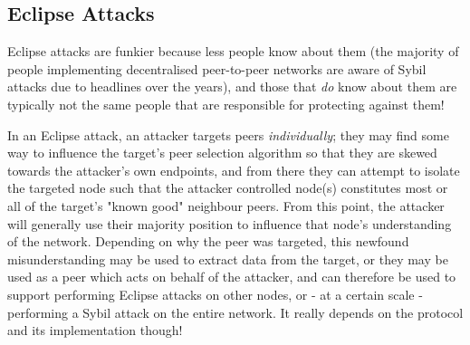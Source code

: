 \subsection{Eclipse Attacks}

Eclipse attacks are funkier because less people know about them (the majority of people implementing decentralised peer-to-peer networks are aware of Sybil attacks due to headlines over the years), and those that \emph{do} know about them are typically not the same people that are responsible for protecting against them!

In an Eclipse attack, an attacker targets peers \emph{individually}; they may find some way to influence the target's peer selection algorithm so that they are skewed towards the attacker's own endpoints, and from there they can attempt to isolate the targeted node such that the attacker controlled node(s) constitutes most or all of the target's "known good" neighbour peers.
         	From this point, the attacker will generally use their majority position to influence that node's understanding of the network. Depending on why the peer was targeted, this newfound misunderstanding may be used to extract data from the target, or they may be used as a peer which acts on behalf of the attacker, and can therefore be used to support performing Eclipse attacks on other nodes, or - at a certain scale - performing a Sybil attack on the entire network. It really depends on the protocol and its implementation though!

